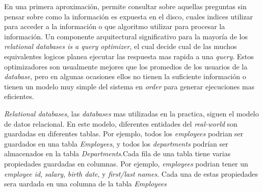 En una primera aproximación,  permite consultar sobre aquellas preguntas sin pensar sobre como la información es expuesta en el disco, cuales indices utilizar para acceder a la información o que algoritmo utilizar para procesar la información. Un componente arquitectural significativo para la mayoría de los \textit{relational databases is a query optimizer}, el cual decide cual de las muchos equivalentes logicos planea ejecutar las respuesta mas rapida a una \textit{query}. Estos optimizadores son usualmente mejores que los promedios de los usuarios de la \textit{database}, pero en algunas ocasiones ellos no tienen la suficiente información o tienen un modelo muy simple del sistema en \textit{order} para generar ejecuciones mas eficientes.

\textit{Relational databases}, las \textit{databases} mas utilizadas en la practica, siguen el modelo de datos relacional. En este modelo, diferentes entidades del \textit{real-world} son guardadas en diferentes tablas. Por ejemplo, todos los \textit{employees} podrian ser guardados en una tabla \textit{Employees}, y todos los \textit{departments} podrían ser almacenados en la tabla \textit{Departments}.Cada fila de una tabla tiene varias propiedades guardadas en columnas. Por ejemplo, \textit{employees} podrian tener un \textit{employee id}, \textit{salary}, \textit{birth date}, y \textit{first/last names}. Cada una de estas propiedades sera uardada en una columna de la tabla \textit{Employees}


